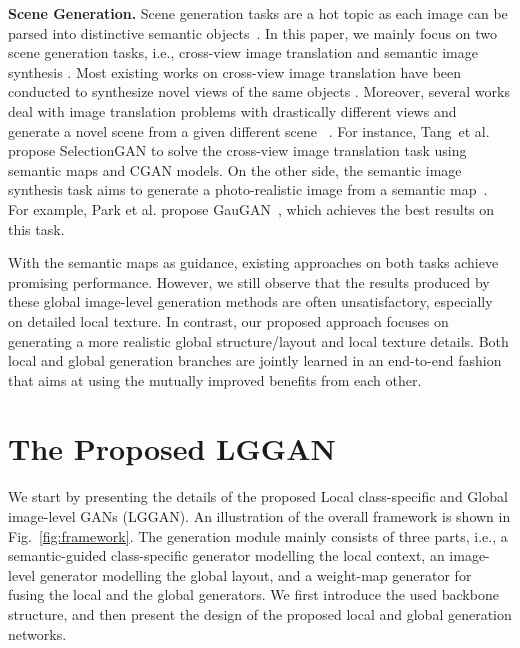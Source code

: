 \documentclass[10pt,twocolumn,letterpaper]{article}
\def\etal{et al.~}
\begin{document}
\noindent\textbf{Scene Generation.}
Scene generation tasks are a hot topic as each image can be parsed into distinctive semantic objects~\cite{bau2019seeing,ashual2019specifying,turkoglu2019layer,gong2019autogan,bau2019semantic,bau2018gan}.
In this paper, we mainly focus on two scene generation tasks, i.e., cross-view image translation \cite{zhai2017predicting,regmi2018cross,regmi2019cross,tang2019multi} and semantic image synthesis \cite{wang2018high, chen2017photographic, qi2018semi, park2019semantic}.
Most existing works on cross-view image translation have been conducted to synthesize novel views of the same objects  \cite{dosovitskiy2017learning,zhou2016view,tatarchenko2016multi,choy20163d}.
Moreover, several works deal with image translation problems with drastically different views and generate a novel scene from a given different scene ~\cite{zhai2017predicting,regmi2018cross,regmi2019cross,tang2019multi}.
For instance,
Tang~\etal \cite{tang2019multi} propose SelectionGAN to solve the cross-view image translation task using semantic maps and CGAN models.
On the other side, the semantic image synthesis task aims to generate a photo-realistic image from a semantic map~\cite{wang2018high, chen2017photographic, qi2018semi, park2019semantic}.
For example, Park et al. propose GauGAN~\cite{park2019semantic}, which achieves the best results on this task.

With the semantic maps as guidance, existing approaches on both tasks achieve promising performance.
However, we still observe that the results produced by these global image-level generation methods are often unsatisfactory, especially on detailed local texture.
In contrast, our proposed approach focuses on generating a more realistic global structure/layout and local texture details.
Both local and global generation branches are jointly learned in an end-to-end fashion that aims at using the mutually improved benefits from each other.




 \section{The Proposed LGGAN}
We start by presenting the details of the proposed Local class-specific and Global image-level GANs (LGGAN). An illustration of the overall framework is shown in Fig.~\ref{fig:framework}. 
The generation module mainly consists of three parts, i.e., a semantic-guided class-specific generator modelling the local context, an image-level generator modelling the global layout, and a weight-map generator for fusing the local and the global generators. 
We first introduce the used backbone structure, and then present the design of the proposed local and global generation networks.
\end{document}
